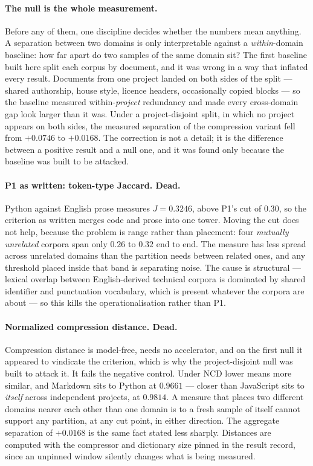 \documentclass[11pt]{article}
\begin{document}
\paragraph{The null is the whole measurement.} Before any of them, one discipline decides whether the numbers mean anything. A separation between two domains is only interpretable against a \emph{within}-domain baseline: how far apart do two samples of the same domain sit? The first baseline built here split each corpus by document, and it was wrong in a way that inflated every result. Documents from one project landed on both sides of the split --- shared authorship, house style, licence headers, occasionally copied blocks --- so the baseline measured within-\emph{project} redundancy and made every cross-domain gap look larger than it was. Under a project-disjoint split, in which no project appears on both sides, the measured separation of the compression variant fell from $+0.0746$ to $+0.0168$. The correction is not a detail; it is the difference between a positive result and a null one, and it was found only because the baseline was built to be attacked.

\paragraph{P1 as written: token-type Jaccard. Dead.} Python against English prose measures $J = 0.3246$, above P1's cut of $0.30$, so the criterion as written merges code and prose into one tower. Moving the cut does not help, because the problem is range rather than placement: four \emph{mutually unrelated} corpora span only $0.26$ to $0.32$ end to end. The measure has less spread across unrelated domains than the partition needs between related ones, and any threshold placed inside that band is separating noise. The cause is structural --- lexical overlap between English-derived technical corpora is dominated by shared identifier and punctuation vocabulary, which is present whatever the corpora are about --- so this kills the operationalisation rather than P1.

\paragraph{Normalized compression distance. Dead.} Compression distance is model-free, needs no accelerator, and on the first null it appeared to vindicate the criterion, which is why the project-disjoint null was built to attack it. It fails the negative control. Under NCD lower means more similar, and Markdown sits to Python at $0.9661$ --- closer than JavaScript sits to \emph{itself} across independent projects, at $0.9814$. A measure that places two different domains nearer each other than one domain is to a fresh sample of itself cannot support any partition, at any cut point, in either direction. The aggregate separation of $+0.0168$ is the same fact stated less sharply. Distances are computed with the compressor and dictionary size pinned in the result record, since an unpinned window silently changes what is being measured.
\end{document}
